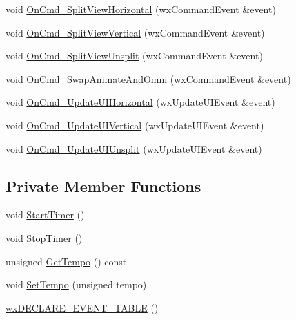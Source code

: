 \begin{DoxyCompactItemize}
\item 
void \hyperlink{a00012_ab3b780fc7a2f4a5a9f446936e2b0048a}{On\-Cmd\-\_\-\-Split\-View\-Horizontal} (wx\-Command\-Event \&event)
\item 
void \hyperlink{a00012_a45e8fa52738d8d66fcc1b151827dc147}{On\-Cmd\-\_\-\-Split\-View\-Vertical} (wx\-Command\-Event \&event)
\item 
void \hyperlink{a00012_aea1520c2384b56db2168c9e505a9a112}{On\-Cmd\-\_\-\-Split\-View\-Unsplit} (wx\-Command\-Event \&event)
\item 
void \hyperlink{a00012_a6d4a2c6c42801aae9aeea9d09f3dc2a0}{On\-Cmd\-\_\-\-Swap\-Animate\-And\-Omni} (wx\-Command\-Event \&event)
\item 
void \hyperlink{a00012_ac0245ddc2c39c08607a589fcc4144e42}{On\-Cmd\-\_\-\-Update\-U\-I\-Horizontal} (wx\-Update\-U\-I\-Event \&event)
\item 
void \hyperlink{a00012_ae19ce9d9595299a042e419de06029c29}{On\-Cmd\-\_\-\-Update\-U\-I\-Vertical} (wx\-Update\-U\-I\-Event \&event)
\item 
void \hyperlink{a00012_ad0733292c32be2844b8f8f87751f9ebf}{On\-Cmd\-\_\-\-Update\-U\-I\-Unsplit} (wx\-Update\-U\-I\-Event \&event)
\end{DoxyCompactItemize}
\subsection*{Private Member Functions}
\begin{DoxyCompactItemize}
\item 
void \hyperlink{a00012_a36ab818a3dd8bc80d781aac236b0d05f}{Start\-Timer} ()
\item 
void \hyperlink{a00012_add918ea87055d1c9ea2cb1b50cea86ff}{Stop\-Timer} ()
\item 
unsigned \hyperlink{a00012_a931add98a5ce97799285d89ddcbcb952}{Get\-Tempo} () const 
\item 
void \hyperlink{a00012_a1786641595eeb2b37b7f9094d7082a99}{Set\-Tempo} (unsigned tempo)
\item 
\hyperlink{a00012_a3942acc9c6a4d49ff2ceb9bbccd3c404}{wx\-D\-E\-C\-L\-A\-R\-E\-\_\-\-E\-V\-E\-N\-T\-\_\-\-T\-A\-B\-L\-E} ()
\end{DoxyCompactItemize}
